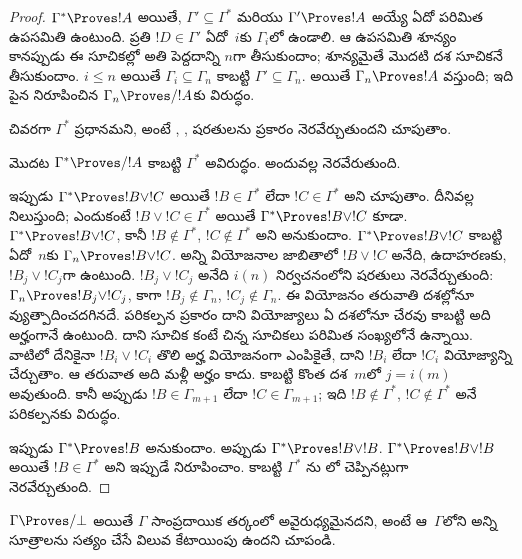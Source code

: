 \documentclass[../../../include/open-logic-section]{subfiles}
\begin{document}
\begin{proof}
  $\Gamma^* \Proves !A$ అయితే, $\Gamma'
  \subseteq \Gamma^*$ మరియు $\Gamma'
  \Proves !A$ అయ్యే ఏదో పరిమిత
  ఉపసమితి ఉంటుంది. ప్రతి $!D \in
  \Gamma'$ ఏదో~$i$కు $\Gamma_i$లో ఉండాలి.
  ఆ ఉపసమితి శూన్యం కానప్పుడు ఈ సూచికల్లో
  అతి పెద్దదాన్ని $n$గా తీసుకుందాం;
  శూన్యమైతే మొదటి దశ సూచికనే తీసుకుందాం.
  $i \le n$ అయితే $\Gamma_i \subseteq
  \Gamma_n$ కాబట్టి $\Gamma'
  \subseteq \Gamma_n$. అయితే
  $\Gamma_n \Proves !A$ వస్తుంది;
  ఇది పైన నిరూపించిన $\Gamma_n \Proves/ !A$కు
  విరుద్ధం.

  చివరగా $\Gamma^*$ ప్రధానమని, అంటే
  , ,
   షరతులను
   ప్రకారం
  నెరవేర్చుతుందని చూపుతాం.

  మొదట $\Gamma^* \Proves/ !A$ కాబట్టి
  $\Gamma^*$ అవిరుద్ధం. అందువల్ల
   నెరవేరుతుంది.

  ఇప్పుడు $\Gamma^* \Proves !B \lor !C$
  అయితే $!B
  \in \Gamma^*$ లేదా $!C \in \Gamma^*$
  అని చూపుతాం. దీనివల్ల 
  నిలుస్తుంది; ఎందుకంటే $!B \lor !C \in
  \Gamma^*$ అయితే $\Gamma^* \Proves !B
  \lor !C$ కూడా. $\Gamma^* \Proves
  !B \lor !C$, కానీ $!B \notin \Gamma^*$,
  $!C \notin \Gamma^*$ అని అనుకుందాం.
  $\Gamma^* \Proves !B \lor !C$ కాబట్టి
  ఏదో~$n$కు $\Gamma_n \Proves !B \lor !C$.
  అన్ని వియోజనాల జాబితాలో $!B \lor
  !C$ అనేది, ఉదాహరణకు, $!B_j \lor !C_j$గా
  ఉంటుంది. $!B_j \lor !C_j$ అనేది $i(n)$ నిర్వచనంలోని
  షరతులు నెరవేర్చుతుంది: $\Gamma_n
  \Proves !B_j
  \lor !C_j$, కాగా $!B_j \notin \Gamma_n$,
  $!C_j \notin \Gamma_n$. ఈ వియోజనం తరువాతి
  దశల్లోనూ వ్యుత్పాదించదగినదే. పరికల్పన ప్రకారం దాని
  వియోజ్యాలు ఏ దశలోనూ చేరవు కాబట్టి అది అర్హంగానే ఉంటుంది.
  దాని సూచిక కంటే చిన్న సూచికలు పరిమిత సంఖ్యలోనే ఉన్నాయి.
  వాటిలో దేనికైనా $!B_i \lor !C_i$ తొలి అర్హ
  వియోజనంగా ఎంపికైతే, దాని $!B_i$ లేదా
  $!C_i$ వియోజ్యాన్ని చేర్చుతాం. ఆ
  తరువాత అది మళ్లీ అర్హం కాదు. కాబట్టి
  కొంత దశ~$m$లో $j = i(m)$ అవుతుంది.
  కానీ అప్పుడు $!B \in \Gamma_{m+1}$
  లేదా $!C \in \Gamma_{m+1}$; ఇది
  $!B \notin \Gamma^*$,
  $!C \notin \Gamma^*$ అనే పరికల్పనకు
  విరుద్ధం.

  ఇప్పుడు $\Gamma^* \Proves !B$ అనుకుందాం.
  అప్పుడు $\Gamma^* \Proves !B \lor
  !B$. $\Gamma^* \Proves !B \lor !B$
  అయితే $!B \in \Gamma^*$ అని ఇప్పుడే
  నిరూపించాం. కాబట్టి $\Gamma^*$
  ను
  లో చెప్పినట్లుగా నెరవేర్చుతుంది.
\end{proof}

\begin{prob}
$\Gamma \Proves/ \bot$ అయితే $\Gamma$
సాంప్రదాయిక తర్కంలో అవైరుధ్యమైనదని, అంటే
ఆ~$\Gamma$లోని అన్ని సూత్రాలను సత్యం చేసే
విలువ కేటాయింపు ఉందని చూపండి.
\end{prob}
\end{document}
